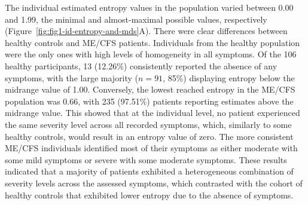 The individual estimated entropy values in the population varied between 0.00 and 1.99, the minimal and almost-maximal possible values, respectively (Figure~\ref{fig:fig1-id-entropy-and-mds}A).
There were clear differences between healthy controls and ME/CFS patients.
Individuals from the healthy population were the only ones with high levels of homogeneity in all symptoms.
Of the 106 healthy participants, 13 (12.26\%) consistently reported the absence of any symptoms, with the large majority ($n = 91$, 85\%) displaying entropy below the midrange value of 1.00.
Conversely, the lowest reached entropy in the ME/CFS population was 0.66, with 235 (97.51\%) patients reporting estimates above the midrange value.
This showed that at the individual level, no \cfs patient experienced the same severity level across all recorded symptoms, which, similarly to some healthy controls, would result in an entropy value of zero.
The more consistent ME/CFS individuals identified most of their symptoms as either moderate with some mild symptoms or severe with some moderate symptoms.
These results indicated that a majority of patients exhibited a heterogeneous combination of severity levels across the assessed symptoms, which contrasted with the cohort of healthy controls that exhibited lower entropy due to the absence of symptoms.

